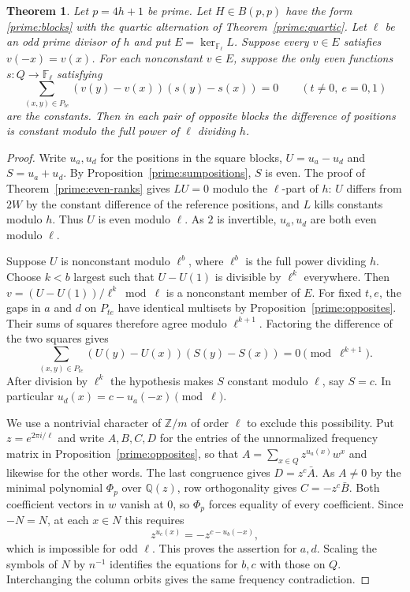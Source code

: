 \documentclass[11pt,a4paper]{article}
\newtheorem{theorem}{Theorem}[section]
\numberwithin{equation}{section}
\begin{document}
\begin{theorem}\label{prime:squared-gaps}
Let $p=4h+1$ be prime. Let $H\in B(p,p)$ have the form \eqref{prime:blocks} with the quartic alternation of Theorem~\ref{prime:quartic}. Let $\ell$ be an odd prime divisor of $h$ and put $E=\ker_{\mathbb F_\ell} L$. Suppose every $v\in E$ satisfies $v(-x)=v(x)$. For each nonconstant $v\in E$, suppose the only even functions $s:Q\to\mathbb F_\ell$ satisfying
\[
 \sum_{(x,y)\in P_{te}}(v(y)-v(x))(s(y)-s(x))=0\qquad(t\ne0,\ e=0,1)
\]
are the constants. Then in each pair of opposite blocks the difference of positions is constant modulo the full power of $\ell$ dividing $h$.
\end{theorem}
\begin{proof}
Write $u_a,u_d$ for the positions in the square blocks, $U=u_a-u_d$ and $S=u_a+u_d$. By Proposition~\ref{prime:sumpositions}, $S$ is even. The proof of Theorem~\ref{prime:even-ranks} gives $LU=0$ modulo the $\ell$-part of $h$: $U$ differs from $2W$ by the constant difference of the reference positions, and $L$ kills constants modulo $h$. Thus $U$ is even modulo $\ell$. As $2$ is invertible, $u_a,u_d$ are both even modulo $\ell$.

Suppose $U$ is nonconstant modulo $\ell^b$, where $\ell^b$ is the full power dividing $h$. Choose $k<b$ largest such that $U-U(1)$ is divisible by $\ell^k$ everywhere. Then $v=(U-U(1))/\ell^k\bmod\ell$ is a nonconstant member of $E$. For fixed $t,e$, the gaps in $a$ and $d$ on $P_{te}$ have identical multisets by Proposition~\ref{prime:opposites}. Their sums of squares therefore agree modulo $\ell^{k+1}$. Factoring the difference of the two squares gives
$$\sum_{(x,y)\in P_{te}}(U(y)-U(x))(S(y)-S(x))=0\pmod{\ell^{k+1}}.$$
After division by $\ell^k$ the hypothesis makes $S$ constant modulo $\ell$, say $S=c$. In particular $u_d(x)=c-u_a(-x)\pmod\ell$.

We use a nontrivial character of $\mathbb Z/m$ of order $\ell$ to exclude this possibility. Put $z=e^{2\pi i/\ell}$ and write $A,B,C,D$ for the entries of the unnormalized frequency matrix in Proposition~\ref{prime:opposites}, so that $A=\sum_{x\in Q}z^{u_a(x)}w^x$ and likewise for the other words. The last congruence gives $D=z^c\bar A$. As $A\ne0$ by the minimal polynomial $\Phi_p$ over $\mathbb Q(z)$, row orthogonality gives $C=-z^c\bar B$. Both coefficient vectors in $w$ vanish at $0$, so $\Phi_p$ forces equality of every coefficient. Since $-N=N$, at each $x\in N$ this requires
$$z^{u_c(x)}=-z^{c-u_b(-x)},$$
which is impossible for odd $\ell$. This proves the assertion for $a,d$. Scaling the symbols of $N$ by $n^{-1}$ identifies the equations for $b,c$ with those on $Q$. Interchanging the column orbits gives the same frequency contradiction.
\end{proof}
\end{document}
